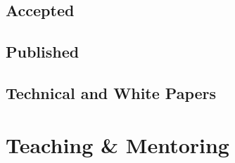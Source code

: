 \documentclass[11pt,letterpaper,sans,unicode]{moderncv}
\begin{document}
\begin{etaremune}[leftmargin=8mm]

\end{etaremune}

\subsection{Accepted}

\begin{etaremune}[leftmargin=8mm]

\end{etaremune}

\subsection{Published}

\begin{etaremune}[leftmargin=8mm]

\end{etaremune}

\subsection{Technical and White Papers}

\begin{etaremune}[leftmargin=8mm]

\end{etaremune}

\section{Teaching \& Mentoring}

\end{document}
